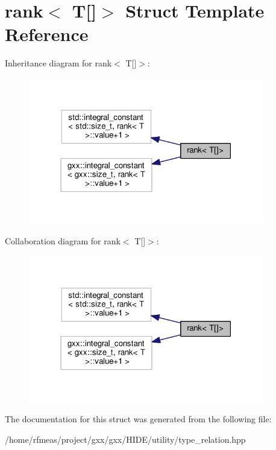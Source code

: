\hypertarget{structrank_3_01T[]_4}{}\section{rank$<$ T\mbox{[}\mbox{]}$>$ Struct Template Reference}
\label{structrank_3_01T[]_4}


Inheritance diagram for rank$<$ T\mbox{[}\mbox{]}$>$\+:
\nopagebreak
\begin{figure}[H]
\begin{center}
\leavevmode
\includegraphics[width=291pt]{structrank_3_01T[]_4__inherit__graph}
\end{center}
\end{figure}


Collaboration diagram for rank$<$ T\mbox{[}\mbox{]}$>$\+:
\nopagebreak
\begin{figure}[H]
\begin{center}
\leavevmode
\includegraphics[width=291pt]{structrank_3_01T[]_4__coll__graph}
\end{center}
\end{figure}


The documentation for this struct was generated from the following file\+:\begin{DoxyCompactItemize}
\item 
/home/rfmeas/project/gxx/gxx/\+H\+I\+D\+E/utility/type\+\_\+relation.\+hpp\end{DoxyCompactItemize}
